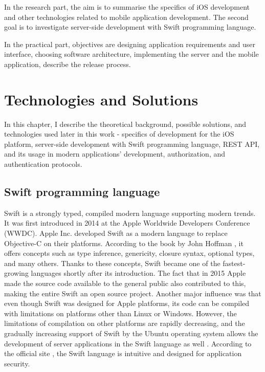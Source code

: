 \documentclass[
  biblatex = false,
  language=english,
  figures=false,
  sourcecodes,
  glossaries,
  index
]{kidiplom}
\begin{document}
In the research part, the aim is to summarise the specifics of iOS development and other technologies related to mobile application development. The second goal is to investigate server-side development with Swift programming language.

In the practical part, objectives are designing application requirements and user interface, choosing software architecture, implementing the server and the mobile application, describe the release process.

\section{Technologies and Solutions}

In this chapter, I describe the theoretical background, possible solutions, and technologies used later in this work - specifics of development for the iOS platform, server-side development with Swift programming language, REST API, and its usage in modern applications' development, authorization, and authentication protocols.

\subsection{Swift programming language}
Swift is a strongly typed, compiled modern language supporting modern trends. It was first introduced in 2014 at the Apple Worldwide Developers Conference (WWDC). Apple Inc. developed Swift as a modern language to replace Objective-C on their platforms. According to the book by John Hoffman \cite{bib2}, it offers concepts such as type inference, genericity, closure syntax, optional types, and many others. Thanks to these concepts, Swift became one of the fastest-growing languages shortly after its introduction. The fact that in 2015 Apple made the source code available to the general public also contributed to this, making the entire Swift an open source project. Another major influence was that even though Swift was designed for Apple platforms, its code can be compiled with limitations on platforms other than Linux or Windows. However, the limitations of compilation on other platforms are rapidly decreasing, and the gradually increasing support of Swift by the Ubuntu operating system allows the development of server applications in the Swift language as well \cite{bib10}. According to the official site \cite{bib3}, the Swift language is intuitive and designed for application security.
\end{document}
